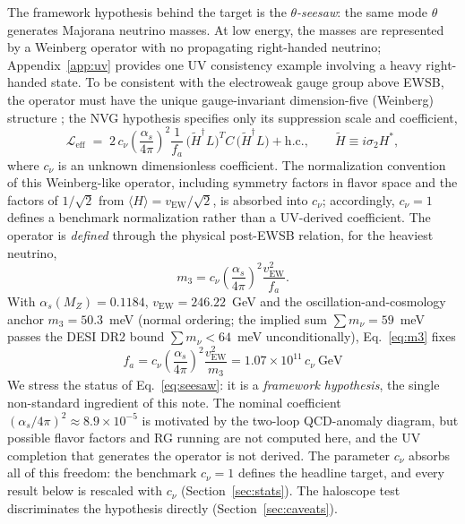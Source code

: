\documentclass[11pt,a4paper]{article}
\begin{document}
The framework hypothesis behind the target is the \emph{$\theta$-seesaw}: the
same mode $\theta$ generates Majorana neutrino masses. At low energy, the
masses are represented by a Weinberg operator with no propagating
right-handed neutrino; Appendix~\ref{app:uv} provides one UV consistency
example involving a heavy right-handed state. To be consistent with the electroweak gauge group above EWSB, the
operator must have the unique gauge-invariant dimension-five (Weinberg)
structure \cite{Weinberg1979}; the NVG hypothesis specifies only its
suppression scale and coefficient,
\begin{equation}
\mathcal{L}_{\mathrm{eff}} \;=\;
2\,c_\nu\left(\frac{\alpha_s}{4\pi}\right)^{\!2}\frac{1}{f_a}\,
\bigl(\tilde H^\dagger L\bigr)^{T} C\,
\bigl(\tilde H^\dagger L\bigr) + \text{h.c.},
\qquad \tilde H \equiv i\sigma_2 H^{*},
\label{eq:seesaw}
\end{equation}
where $c_\nu$ is an unknown dimensionless coefficient. The normalization
convention of this Weinberg-like operator, including symmetry factors in
flavor space and the factors of $1/\sqrt{2}$ from
$\langle H \rangle = v_{\mathrm{EW}}/\sqrt{2}$, is absorbed into $c_\nu$;
accordingly, $c_\nu = 1$ defines a benchmark normalization rather than a
UV-derived coefficient. The operator is \emph{defined} through the physical
post-EWSB relation, for the heaviest neutrino,
\begin{equation}
m_3 = c_\nu\left(\frac{\alpha_s}{4\pi}\right)^{\!2}\frac{v_{\mathrm{EW}}^{2}}{f_a}.
\label{eq:m3}
\end{equation}
With $\alpha_s(M_Z) = 0.1184$, $v_{\mathrm{EW}} = 246.22$~GeV and the
oscillation-and-cosmology anchor $m_3 = 50.3$~meV (normal ordering; the
implied sum $\sum m_\nu = 59$~meV passes the DESI DR2 bound
$\sum m_\nu < 64$~meV unconditionally), Eq.~\eqref{eq:m3} fixes
\begin{equation}
\boxed{\;f_a = c_\nu\left(\frac{\alpha_s}{4\pi}\right)^{\!2}
\frac{v_{\mathrm{EW}}^{2}}{m_3} = 1.07\times 10^{11}\,c_\nu~\text{GeV}\;}
\label{eq:fa}
\end{equation}
We stress the status of Eq.~\eqref{eq:seesaw}: it is a \emph{framework
hypothesis}, the single non-standard ingredient of this note. The nominal
coefficient $(\alpha_s/4\pi)^2 \approx 8.9\times 10^{-5}$ is motivated by the
two-loop QCD-anomaly diagram, but possible flavor factors and RG running are
not computed here, and the UV completion that generates the operator is not
derived. The parameter $c_\nu$ absorbs all of this freedom: the benchmark
$c_\nu = 1$ defines the headline target, and every result below is rescaled
with $c_\nu$ (Section~\ref{sec:stats}). The haloscope test discriminates the
hypothesis directly (Section~\ref{sec:caveats}).
\end{document}
